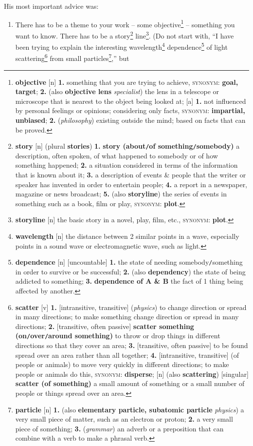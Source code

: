 \documentclass[oneside]{book}
\numberwithin{equation}{section}
\begin{document}
His most important advice was:
\begin{enumerate}
	\item There has to be a theme to your work -- some objective\footnote{\textbf{objective} [n] \textbf{1.} something that you are trying to achieve, \textsc{synonym}: \textbf{goal, target}; \textbf{2.} (also \textbf{objective lens} \textit{specialist}) the lens in a telescope or microscope that is nearest to the object being looked at; [a] \textbf{1.} not influenced by personal feelings or opinions; considering only facts, \textsc{synonym}: \textbf{impartial, unbiased}; \textbf{2.} (\textit{philosophy}) existing outside the mind; based on facts that can be proved.} -- something you want to know. There has to be a story\footnote{\textbf{story} [n] (plural \textbf{stories}) \textbf{1.} \textbf{story (about\texttt{/}of something\texttt{/}somebody)} a description, often spoken, of what happened to somebody or of how something happened; \textbf{2.} a situation considered in terms of the information that is known about it; \textbf{3.} a description of events \& people that the writer or speaker has invented in order to entertain people; \textbf{4.} a report in a newspaper, magazine or news broadcast; \textbf{5.} (also \textbf{storyline}) the series of events in something such as a book, film or play, \textsc{synonym}: \textbf{plot}.} line\footnote{\textbf{storyline} [n] the basic story in a novel, play, film, etc., \textsc{synonym}: \textbf{plot}.}. (Do not start with, ``I have been trying to explain the interesting wavelength\footnote{\textbf{wavelength} [n] the distance between 2 similar points in a wave, especially points in a sound wave or electromagnetic wave, such as light.} dependence\footnote{\textbf{dependence} [n] [uncountable] \textbf{1.} the state of needing somebody\texttt{/}something in order to survive or be successful; \textbf{2.} (also \textbf{dependency}) the state of being addicted to something; \textbf{3.} \textbf{dependence of A \& B} the fact of 1 thing being affected by another.} of light scattering\footnote{\textbf{scatter} [v] \textbf{1.} [intransitive, transitive] (\textit{physics}) to change direction or spread in many directions; to make something change direction or spread in many directions; \textbf{2.} [transitive, often passive] \textbf{scatter something (on\texttt{/}over\texttt{/}around something)} to throw or drop things in different directions so that they cover an area; \textbf{3.} [transitive, often passive] to be found spread over an area rather than all together; \textbf{4.} [intransitive, transitive] (of people or animals) to move very quickly in different directions; to make people or animals do this, \textsc{synonym}: \textbf{disperse}; [n] (also \textbf{scattering}) [singular] \textbf{scatter (of something)} a small amount of something or a small number of people or things spread over an area.} from small particles\footnote{\textbf{particle} [n] \textbf{1.} (also \textbf{elementary particle, subatomic particle} \textit{physics}) a very small piece of matter, such as an electron or proton; \textbf{2.} a very small piece of something; \textbf{3.} (\textit{grammar}) an adverb or a preposition that can combine with a verb to make a phrasal verb.},'' but 
\end{enumerate}
\end{document}
